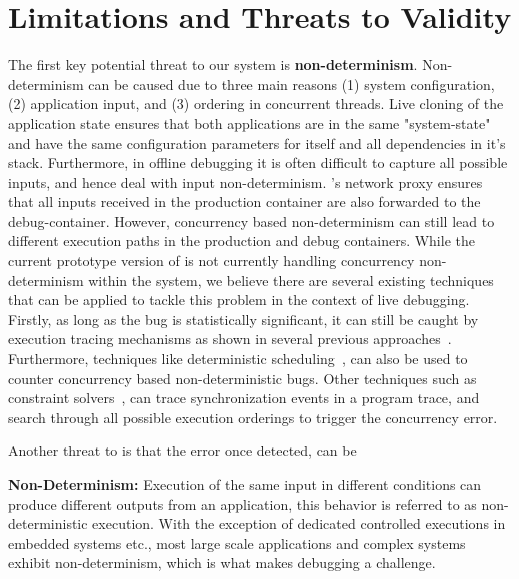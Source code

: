 \section{Limitations and Threats to Validity}
\label{sec:limitation}

The first key potential threat to our system is \textbf{non-determinism}. 
Non-determinism can be caused due to three main reasons (1) system configuration, (2) application input, and (3) ordering in concurrent threads.
Live cloning of the application state ensures that both applications are in the same "system-state" and have the same configuration parameters for itself and all dependencies in it's stack.
Furthermore, in offline debugging it is often difficult to capture all possible inputs, and hence deal with input non-determinism.
\parikshan's network proxy ensures that all inputs received in the production container are also forwarded to the debug-container.
However, concurrency based non-determinism can still lead to different execution paths in the production and debug containers.
While the current prototype version of \parikshan is not currently handling concurrency non-determinism within the system, we believe there are several existing techniques that can be applied to tackle this problem in the context of live debugging. 
Firstly, as long as the bug is statistically significant, it can still be caught by execution tracing mechanisms as shown in several previous approaches~\cite{statistical}.
Furthermore, techniques like deterministic scheduling~\cite{deterministicScheduling}, can also be used to counter concurrency based non-deterministic bugs.
Other techniques such as constraint solvers~\cite{DPOR}, can trace synchronization events in a program trace, and search through all possible execution orderings to trigger the concurrency error.


Another threat to \parikshan is that the error once detected, can be 
\iffalse

\textbf{Non-Determinism: } 
Execution of the same input in different conditions can produce different outputs from an application, this behavior is referred to as non-deterministic execution.
With the exception of dedicated controlled executions in embedded systems etc., most large scale applications and complex systems exhibit non-determinism, which is what makes debugging a challenge.

